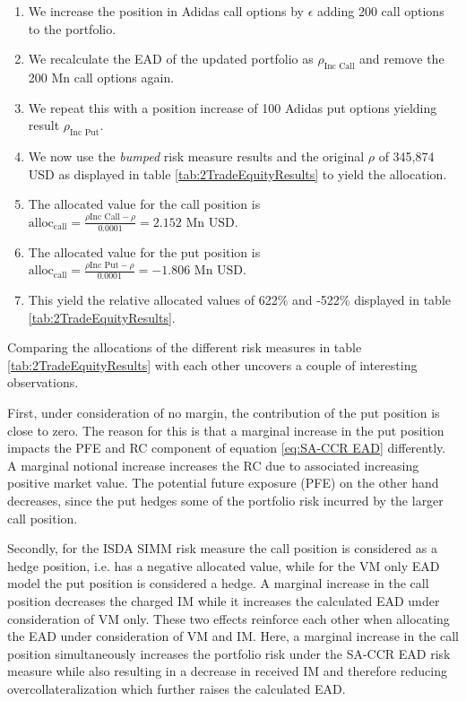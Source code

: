 \documentclass[../Thesis_AHoecherl.tex]{subfiles}
\begin{document}
    \begin{enumerate}
        \item We increase the position in Adidas call options by $\epsilon$ adding 200 call options to the portfolio.
        \item We recalculate the \gls{EAD} of the updated portfolio as $\rho_{\text{Inc Call}}$ and remove the 200 Mn call options again.
        \item We repeat this with a position increase of 100 Adidas put options yielding result $\rho_{\text{Inc Put}}$.
        \item We now use the \emph{bumped} risk measure results and the original $\rho$ of 345,874 USD as displayed in table \ref{tab:2TradeEquityResults} to yield the allocation.
        \item The allocated value for the call position is $\text{alloc}_\text{call}=\frac{\rho{\text{Inc Call}-\rho}}{0.0001} = 2.152 \text{ Mn USD}$.
        \item The allocated value for the put position is $\text{alloc}_\text{call}=\frac{\rho{\text{Inc Put}-\rho}}{0.0001} = -1.806 \text{ Mn USD}$.
        \item This yield the relative allocated values of 622\% and -522\% displayed in table \ref{tab:2TradeEquityResults}.
    \end{enumerate}

    Comparing the allocations of the different risk measures in table \ref{tab:2TradeEquityResults} with each other uncovers a couple of interesting observations. 
    
    First, under consideration of no margin, the contribution of the put position is close to zero. 
    The reason for this is that a marginal increase in the put position impacts the PFE and RC component of equation \ref{eq:SA-CCR EAD} differently. A marginal notional increase increases the RC due to associated increasing positive market value.
    The potential future exposure (PFE) on the other hand decreases, since the put hedges some of the portfolio risk incurred by the larger call position.

    Secondly, for the \gls{ISDA SIMM} risk measure the call position is considered as a hedge position, i.e. has a negative allocated value, while for the \gls{VM} only \gls{EAD} model the put position is considered a hedge. 
    A marginal increase in the call position decreases the charged \gls{IM} while it increases the calculated \gls{EAD} under consideration of \gls{VM} only. 
    These two effects reinforce each other when allocating the \gls{EAD} under consideration of \gls{VM} and IM. Here, a marginal increase in the call position simultaneously increases the portfolio risk under the \gls{SA-CCR} \gls{EAD} risk measure while also resulting in a decrease in received \gls{IM} and therefore reducing overcollateralization which further raises the calculated EAD. 
    
\end{document}
